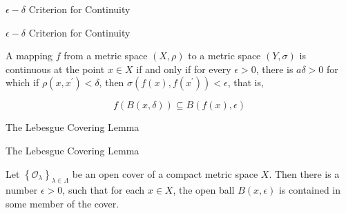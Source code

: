 \documentclass[17pt]{extarticle}
\newcommand{\boxset}[2]{\begin{mdframed}[style=darkQuesion]
#1
\end{mdframed}
\newpage
\begin{mdframed}[style=darkQuesion]
#1
  \end{mdframed}
\begin{mdframed}[style=darkAnswer]
#2
  \end{mdframed}
  \newpage
}
\begin{document}
\boxset{$\epsilon-\delta$ Criterion for Continuity}
{
A mapping $f$ from a metric space $(X, \rho)$ to a metric space $(Y, \sigma)$ is continuous at the point $x \in X$ if and only if for every $\epsilon>0$, there is $a \delta>0$ for which if $\rho\left(x, x^{\prime}\right)<\delta$, then $\sigma\left(f(x), f\left(x^{\prime}\right)\right)<\epsilon$, that is,

\[
f(B(x, \delta)) \subseteq B(f(x), \epsilon)
\]

}
\boxset{The Lebesgue Covering Lemma}
{
Let $\left\{\mathcal{O}_{\lambda}\right\}_{\lambda \in \Lambda}$ be an open cover of a compact metric space $X$. Then there is a number $\epsilon>0$, such that for each $x \in X$, the open ball $B(x, \epsilon)$ is contained in some member of the cover.
}
\end{document}
